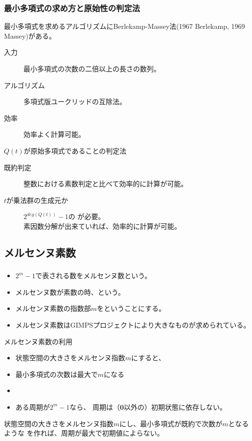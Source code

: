 \documentclass[cjk, dvips, handout, trans, xcolor=dvipsnames, hyperref={bookmarks=false}]{beamer}
\begin{document}
\begin{frame}[t]
  \frametitle{最小多項式の求め方と原始性の判定法}
  最小多項式を求めるアルゴリズムにBerlekamp-Massey法(1967 Berlekamp,
  1969 Massey)がある。
  \begin{description}
  \item[入力] 最小多項式の次数の二倍以上の長さの数列。
  \item[アルゴリズム] 多項式版ユークリッドの互除法。
  \item[効率] 効率よく計算可能。
  \end{description}

  \pause
  \vspace{\baselineskip}
  $Q(t)$が原始多項式であることの判定法
  \begin{description}
  \item[既約判定] 整数における素数判定と比べて効率的に計算が可能。
  \item[$t$が乗法群の生成元か] $2^{deg(Q(t))}-1$の
    が必要。\\
    素因数分解が出来ていれば、効率的に計算が可能。
  \end{description}
\end{frame}

\subsection{メルセンヌ素数}
\begin{frame}[t]
  \frametitle{\insertsubsection}
  \begin{itemize}
  \item $2^m-1$で表される数をメルセンヌ数という。
  \item メルセンヌ数が素数の時、という。
  \item メルセンヌ素数の指数部$m$をということにする。
  \item メルセンヌ素数はGIMPSプロジェクトにより大きなものが求められている。
  \end{itemize}

  \pause
  \begin{block}{メルセンヌ素数の利用}
    \begin{itemize}
    \item[] 状態空間の大きさをメルセンヌ指数$m$にすると、
    \item 最小多項式の次数は最大で$m$になる
    \item {}
    \item ある周期が$2^m-1$なら、
      周期は（$\mathbf{0}$以外の）初期状態に依存しない。
    \end{itemize}
    状態空間の大きさをメルセンヌ指数$m$にし、最小多項式が既約で次数が$m$となるような
    \FLPRNG を作れば、周期が最大で初期値によらない。
  \end{block}
\end{frame}
\end{document}
